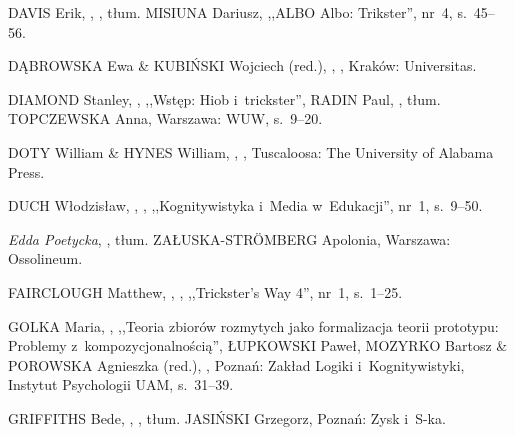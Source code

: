 \documentclass[11pt,a4paper,twoside]{report}
\begin{document}
\begin{thebibliography}{}
{DAVIS Erik},
,
,
\newblock tłum. {MISIUNA Dariusz},
\newblock {[w:]} ,,ALBO Albo: Trikster'',
\newblock nr~4, s.~45--56.

{DĄBROWSKA Ewa \& KUBIŃSKI Wojciech (red.)},
,
,
\newblock Kraków: Universitas.

{DIAMOND Stanley},
,
\newblock ,,Wstęp: Hiob i~trickster'',
\newblock {[do:]} {RADIN Paul},
,
\newblock tłum. {TOPCZEWSKA Anna},
\newblock Warszawa: WUW,
\newblock s.~9--20.

{DOTY William \& HYNES William},
,
,
\newblock Tuscaloosa: The University of Alabama Press.

{DUCH Włodzisław},
,
,
\newblock {[w:]} ,,Kognitywistyka i~Media w~Edukacji'',
\newblock nr~1, s.~9--50.

{\emph{Edda Poetycka}},
,
\newblock tłum. {ZAŁUSKA-STRÖMBERG Apolonia},
\newblock Warszawa: Ossolineum.

{FAIRCLOUGH Matthew},
,
,
\newblock {[w:]} ,,Trickster’s Way 4'',
\newblock nr~1, s.~1--25.

{GOLKA Maria},
,
\newblock ,,Teoria zbiorów rozmytych jako formalizacja teorii prototypu: Problemy z~kompozycjonalnością'',
\newblock {[w:]} {ŁUPKOWSKI Paweł, MOZYRKO Bartosz \& POROWSKA Agnieszka (red.)},
,
\newblock Poznań: Zakład Logiki i~Kognitywistyki, Instytut Psychologii UAM,
\newblock s.~31--39.

{GRIFFITHS Bede},
,
,
\newblock tłum. {JASIŃSKI Grzegorz},
\newblock Poznań: Zysk i~S-ka.


\end{thebibliography}
\end{document}
